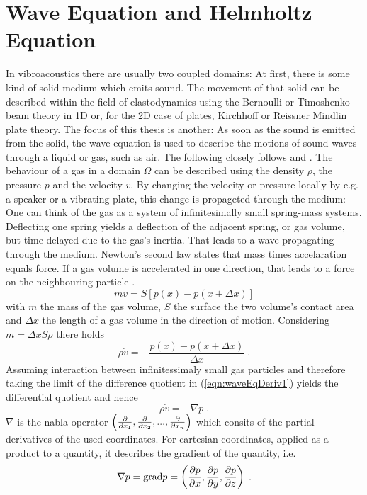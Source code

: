 \documentclass[%
  a4paper,oneside,%
  11pt,%
  smallchapters,
  green,%
  rgb, <cmyk>
  ]{tubsbook}
\begin{document}
\section{Wave Equation and Helmholtz Equation}
In vibroacoustics there are usually two coupled domains: At first, there is some kind of solid medium which emits sound. The movement of that solid can be described within the field of elastodynamics using the Bernoulli or Timoshenko beam theory in 1D or, for the 2D case of plates, Kirchhoff or Reissner Mindlin plate theory. The focus of this thesis is another: As soon as the sound is emitted from the solid, the wave equation is used to describe the motions of sound waves through a liquid or gas, such as air. 
The following closely follows \cite{larson2013} and \cite{moser2005}.
The behaviour of a gas in a domain $\Omega$ can be described using the density $\rho$, the pressure $p$ and the velocity $v$. By changing the velocity or pressure locally by e.g. a speaker or a vibrating plate, this change is propageted through the medium: One can think of the gas as a system of infinitesimally small spring-mass systems. Deflecting one spring yields a deflection of the adjacent spring, or gas volume, but time-delayed due to the gas's inertia. That leads to a wave propagating through the medium. 
Newton's second law states that mass times accelaration equals force. If a gas volume is accelerated in one direction, that leads to a force on the neighbouring particle \cite{moser2005}.
%
\begin{equation}
m \dot{v} = S  \left[  p(x) -p(x + \Delta x)  \right] 
\end{equation}
with $m$ the mass of the gas volume, $S$ the surface the two volume's contact area and $\Delta x$ the length of a gas volume in the direction of motion. Considering $m = \Delta x S \rho$ there holds
\begin{equation}
\rho \dot{v} = - \frac{p(x) -p(x + \Delta x)}{\Delta x} \; .
\label{eqn:waveEqDeriv1}
\end{equation}
Assuming interaction between infinitessimaly small gas particles and therefore taking the limit of the difference quotient in (\ref{eqn:waveEqDeriv1}) yields the differential quotient and hence
\begin{equation}
\rho \dot{v} = - \nabla p \;.
\label{eqn:Tragheitsges}
\end{equation}
$\nabla$ is the nabla operator $\left( \pdv{}{x_1},\pdv{}{x_2},...,\pdv{}{x_n} \right)$ which consits of the partial derivatives of the used coordinates. For cartesian coordinates, applied as a product to a quantity, it describes the gradient of the quantity, i.e.
\begin{equation}
\nabla p = \mathrm{grad}p = \left( \pdv{p}{x},\pdv{p}{y},\pdv{p}{z} \right) \;.
\end{equation}
\end{document}
